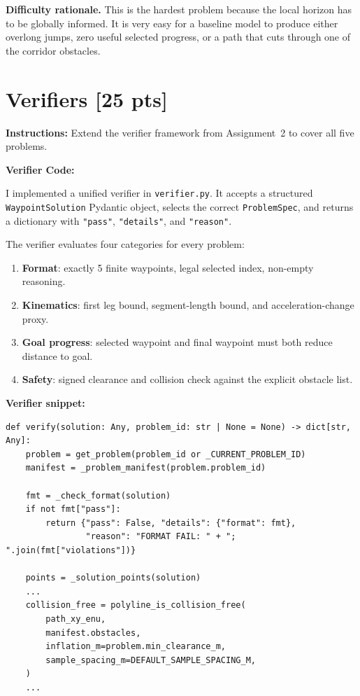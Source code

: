 \documentclass[12pt]{article}
\begin{document}
\noindent\textbf{Difficulty rationale.}
This is the hardest problem because the local horizon has to be globally informed. It is very easy
for a baseline model to produce either overlong jumps, zero useful selected progress, or a path
that cuts through one of the corridor obstacles.

\newpage
\section{Verifiers \textnormal{[25 pts]}}
\label{sec:verifiers_filled}

\textbf{Instructions:} Extend the verifier framework from Assignment~2 to
cover all five problems.

\bigskip
\textbf{Verifier Code:}

\medskip
\noindent
I implemented a unified verifier in \texttt{verifier.py}. It accepts a structured
\texttt{WaypointSolution} Pydantic object, selects the correct \texttt{ProblemSpec}, and returns
a dictionary with \texttt{"pass"}, \texttt{"details"}, and \texttt{"reason"}.

\medskip
\noindent
The verifier evaluates four categories for every problem:
\begin{enumerate}[leftmargin=1.4em]
  \item \textbf{Format}: exactly 5 finite waypoints, legal selected index, non-empty reasoning.
  \item \textbf{Kinematics}: first leg bound, segment-length bound, and acceleration-change proxy.
  \item \textbf{Goal progress}: selected waypoint and final waypoint must both reduce distance to goal.
  \item \textbf{Safety}: signed clearance and collision check against the explicit obstacle list.
\end{enumerate}

\noindent\textbf{Verifier snippet:}
\begin{lstlisting}[style=pycode]
def verify(solution: Any, problem_id: str | None = None) -> dict[str, Any]:
    problem = get_problem(problem_id or _CURRENT_PROBLEM_ID)
    manifest = _problem_manifest(problem.problem_id)

    fmt = _check_format(solution)
    if not fmt["pass"]:
        return {"pass": False, "details": {"format": fmt},
                "reason": "FORMAT FAIL: " + "; ".join(fmt["violations"])}

    points = _solution_points(solution)
    ...
    collision_free = polyline_is_collision_free(
        path_xy_enu,
        manifest.obstacles,
        inflation_m=problem.min_clearance_m,
        sample_spacing_m=DEFAULT_SAMPLE_SPACING_M,
    )
    ...
\end{lstlisting}
\end{document}
